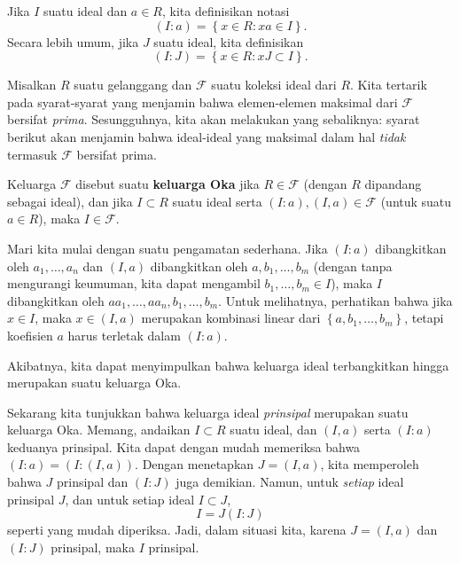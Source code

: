 Jika $I$ suatu ideal dan $a \in R$, kita definisikan notasi
\[ (I:a) = \left\{ x\in R: xa \in I\right\} . \]
Secara lebih umum, jika $J$ suatu ideal, kita definisikan
\[ (I:J) = \left\{x \in R: xJ \subset I\right\} . \]

Misalkan $R$ suatu gelanggang dan $\mathcal{F}$ suatu koleksi ideal dari $R$. 
Kita tertarik pada syarat-syarat yang menjamin bahwa elemen-elemen maksimal
dari $\mathcal{F}$ bersifat \emph{prima}.
Sesungguhnya, kita akan melakukan yang sebaliknya: syarat berikut akan menjamin bahwa
ideal-ideal yang maksimal dalam hal \emph{tidak} termasuk $\mathcal{F}$ bersifat prima. 

\begin{definition} \label{okafamily}
Keluarga $\mathcal{F}$ disebut suatu \textbf{keluarga Oka} jika $R \in
\mathcal{F}$ (dengan $R$ dipandang sebagai ideal), dan jika $I \subset R$ suatu
ideal serta $(I:a), (I,a) \in \mathcal{F}$ (untuk suatu $a \in R$), maka $I \in
\mathcal{F}$.
\end{definition} 

\begin{example} \label{exm:okacard}
Mari kita mulai dengan suatu pengamatan sederhana. Jika $(I:a)$ dibangkitkan oleh
$a_1, \dots, a_n$ dan $(I,a)$ dibangkitkan oleh $a, b_1, \dots, b_m$ (dengan
tanpa mengurangi keumuman, kita dapat mengambil
$b_1, \dots, b_m \in I$), maka $I$
dibangkitkan oleh $aa_1, \dots, aa_n, b_1, \dots, b_m$.
Untuk melihatnya, perhatikan bahwa jika $x \in I$, maka $x \in (I,a)$ merupakan kombinasi
linear dari $\left\{a, b_1, \dots, b_m\right\}$, tetapi koefisien
$a$ harus
terletak dalam $(I:a)$.

Akibatnya, kita dapat menyimpulkan bahwa
keluarga ideal terbangkitkan hingga merupakan suatu keluarga Oka.
\end{example} 

\begin{example} 
Sekarang kita tunjukkan bahwa keluarga ideal \emph{prinsipal} merupakan suatu keluarga Oka.
Memang, andaikan $I \subset R$ suatu ideal, dan $(I,a)$ serta $(I:a)$ keduanya
prinsipal.
Kita dapat dengan mudah memeriksa bahwa
$(I:a) = (I: (I, a))$.
Dengan menetapkan $J = (I,a)$, kita memperoleh bahwa $J$ prinsipal dan $(I:J)$ juga demikian.
Namun, untuk \emph{setiap} ideal prinsipal $J$, dan untuk setiap ideal $I \subset J$,
\[ I = J (I: J)  \]
seperti yang mudah diperiksa. Jadi, dalam situasi kita, karena $J=(I,a)$ dan
$(I:J)$
prinsipal, maka $I$ prinsipal.
\end{example} 

